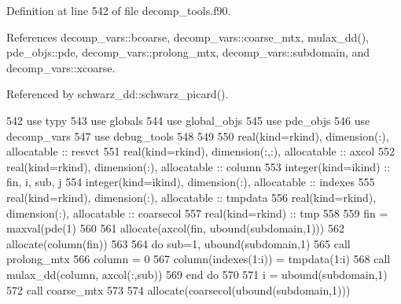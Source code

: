Definition at line 542 of file decomp\+\_\+tools.\+f90.



References decomp\+\_\+vars\+::bcoarse, decomp\+\_\+vars\+::coarse\+\_\+mtx, mulax\+\_\+dd(), pde\+\_\+objs\+::pde, decomp\+\_\+vars\+::prolong\+\_\+mtx, decomp\+\_\+vars\+::subdomain, and decomp\+\_\+vars\+::xcoarse.



Referenced by schwarz\+\_\+dd\+::schwarz\+\_\+picard().


\begin{DoxyCode}
542       \textcolor{keywordtype}{use }typy
543       \textcolor{keywordtype}{use }globals
544       \textcolor{keywordtype}{use }global_objs
545       \textcolor{keywordtype}{use }pde_objs
546       \textcolor{keywordtype}{use }decomp_vars
547       \textcolor{keywordtype}{use }debug_tools
548       
549       
550       \textcolor{keywordtype}{real(kind=rkind)}, \textcolor{keywordtype}{dimension(:)}, \textcolor{keywordtype}{allocatable} :: resvct
551       \textcolor{keywordtype}{real(kind=rkind)}, \textcolor{keywordtype}{dimension(:,:)}, \textcolor{keywordtype}{allocatable} ::  axcol
552       \textcolor{keywordtype}{real(kind=rkind)}, \textcolor{keywordtype}{dimension(:)}, \textcolor{keywordtype}{allocatable} :: column
553       \textcolor{keywordtype}{integer(kind=ikind)} :: fin, i, sub, j
554       \textcolor{keywordtype}{integer(kind=ikind)}, \textcolor{keywordtype}{dimension(:)}, \textcolor{keywordtype}{allocatable} :: indexes
555       \textcolor{keywordtype}{real(kind=rkind)}, \textcolor{keywordtype}{dimension(:)}, \textcolor{keywordtype}{allocatable} :: tmpdata
556       \textcolor{keywordtype}{real(kind=rkind)}, \textcolor{keywordtype}{dimension(:)}, \textcolor{keywordtype}{allocatable} :: coarsecol
557       \textcolor{keywordtype}{real(kind=rkind)} :: tmp
558       
559       fin = maxval(pde(1)%
560       
561       \textcolor{keyword}{allocate}(axcol(fin, ubound(subdomain,1)))
562       \textcolor{keyword}{allocate}(column(fin))
563                   
564       \textcolor{keywordflow}{do} sub=1, ubound(subdomain,1)
565         \textcolor{keyword}{call }prolong_mtx%
566         column = 0
567         column(indexes(1:i)) = tmpdata(1:i)
568         \textcolor{keyword}{call }mulax\_dd(column, axcol(:,sub))
569 \textcolor{keywordflow}{      end do}
570       
571       i = ubound(subdomain,1)
572       \textcolor{keyword}{call }coarse_mtx%
573       
574       \textcolor{keyword}{allocate}(coarsecol(ubound(subdomain,1)))

\end{DoxyCode}
